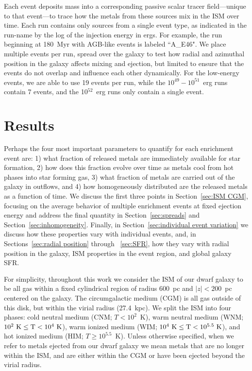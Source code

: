 \documentclass[twocolumn]{aastex62}
\newcommand{\runone}{A\_}
\begin{document}
Each event deposits mass into a corresponding passive scalar tracer field---unique to that event---to trace how the metals from these sources mix in the ISM over time. Each run contains only sources from a single event type, as indicated in the run-name by the log of the injection energy in ergs. For example, the run beginning at 180~Myr with AGB-like events is labeled ``\runone E46". We place multiple events per run, spread over the galaxy to test how radial and azimuthal position in the galaxy affects mixing and ejection, but limited to ensure that the events do not overlap and influence each other dynamically. For the low-energy events, we are able to use 19 events per run, while the $10^{49}-10^{51}$~erg runs contain 7 events, and the 10$^{52}$~erg runs only contain a single event.

\section{Results}
\label{sec:results}
Perhaps the four most important parameters to quantify for each enrichment event are: 1) what fraction of released metals are immediately available for star formation, 2) how does this fraction evolve over time as metals cool from hot phases into star forming gas, 3) what fraction of metals are carried out of the galaxy in outflows, and 4) how homogeneously distributed are the released metals as a function of time. We discuss the first three points in Section~\ref{sec:ISM CGM}, focusing on the average behavior of multiple enrichment events at fixed ejection energy and address the final quantity in Section~\ref{sec:spreads} and Section~\ref{sec:inhomogeneity}. Finally, in Section~\ref{sec:individual event variation} we discuss how these properties vary with individual events, and, in Sections~\ref{sec:radial position} through ~\ref{sec:SFR}, how they vary with radial position in the galaxy, ISM properties in the event region, and global galaxy SFR.

For simplicity, throughout this work we consider the ISM of our dwarf galaxy to be all gas within a fixed cylindrical region of radius 600~pc and $|z| < 200$~pc centered on the galaxy. The circumgalactic medium (CGM) is all gas outside of this disk, but within the virial radius (27.4~kpc). We split the ISM into four phases: cold neutral medium (CNM; $T < 10^2$~K), warm neutral medium (WNM; $10^{2}~\rm{K} \leq T < 10^{4}~ \rm{K}$), warm ionized medium (WIM; $10^{4}~\rm{K} \leq T < 10^{5.5}~\rm{K} $), and hot ionized medium (HIM; $T \geq 10^{5.5}$~K). Unless otherwise specified, when we refer to metals ejected from our dwarf galaxy we mean metals that are no longer within the ISM, and are either within the CGM or have been ejected beyond the virial radius.
\end{document}
